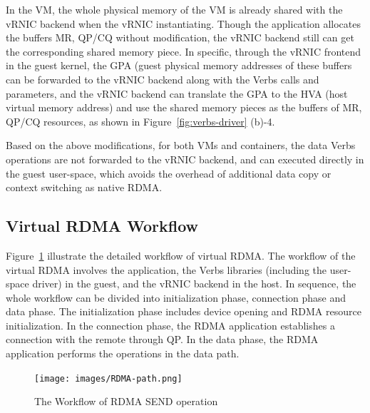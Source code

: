 In the VM, the whole physical memory of the VM is already shared with the vRNIC backend when the vRNIC instantiating. Though the application allocates the buffers MR, QP/CQ without modification, the vRNIC backend still can get the corresponding shared memory piece. In specific, through the vRNIC frontend in the guest kernel, the GPA (guest physical memory addresses of these buffers can be forwarded to the vRNIC backend along with the Verbs calls and parameters, and the vRNIC backend can translate the GPA to the HVA (host virtual memory address) and use the shared memory pieces as the buffers of MR, QP/CQ resources, as shown in Figure~\ref{fig:verbs-driver} (b)-4.


Based on the above modifications, for both VMs and containers,  the data Verbs operations are not forwarded to the vRNIC backend, and can executed directly in the guest user-space, which avoids the overhead of additional data copy or context switching as native RDMA.

\subsection{Virtual RDMA Workflow}


Figure~\ref{fig:rdma-path} illustrate the detailed workflow of virtual RDMA. The workflow of the virtual RDMA involves the application, the Verbs libraries (including the user-space driver) in the guest, and the vRNIC backend in the host. In sequence, the whole workflow can be divided into initialization phase, connection phase and data phase. The initialization phase includes device opening and RDMA resource initialization. In the connection phase, the RDMA application establishes a connection with the remote through QP. In the data phase, the RDMA application performs the operations in the data path.

\begin{figure}[!ht]
	\centering
	\texttt{[image: images/RDMA-path.png]}
	\caption{The Workflow of RDMA SEND operation}
	\label{fig:rdma-path}
\end{figure}

